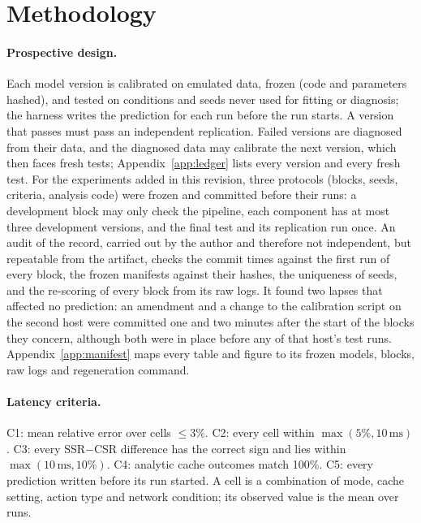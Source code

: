 \documentclass[acmsmall,review,nonacm]{acmart}
\begin{document}
\section{Methodology}
\label{sec:protocol}

\paragraph{Prospective design.}
Each model version is calibrated on emulated data, frozen (code and parameters hashed), and tested on conditions and seeds never used for fitting or diagnosis; the harness writes the prediction for each run before the run starts. A version that passes must pass an independent replication. Failed versions are diagnosed from their data, and the diagnosed data may calibrate the next version, which then faces fresh tests; Appendix~\ref{app:ledger} lists every version and every fresh test. For the experiments added in this revision, three protocols (blocks, seeds, criteria, analysis code) were frozen and committed before their runs: a development block may only check the pipeline, each component has at most three development versions, and the final test and its replication run once. An audit of the record, carried out by the author and therefore not independent, but repeatable from the artifact, checks the commit times against the first run of every block, the frozen manifests against their hashes, the uniqueness of seeds, and the re-scoring of every block from its raw logs. It found two lapses that affected no prediction: an amendment and a change to the calibration script on the second host were committed one and two minutes after the start of the blocks they concern, although both were in place before any of that host's test runs. Appendix~\ref{app:manifest} maps every table and figure to its frozen models, blocks, raw logs and regeneration command.

\paragraph{Latency criteria.}
C1: mean relative error over cells $\le 3\%$. C2: every cell within $\max(5\%, 10\,\text{ms})$. C3: every SSR$-$CSR difference has the correct sign and lies within $\max(10\,\text{ms}, 10\%)$. C4: analytic cache outcomes match 100\%. C5: every prediction written before its run started. A cell is a combination of mode, cache setting, action type and network condition; its observed value is the mean over runs.
\end{document}
